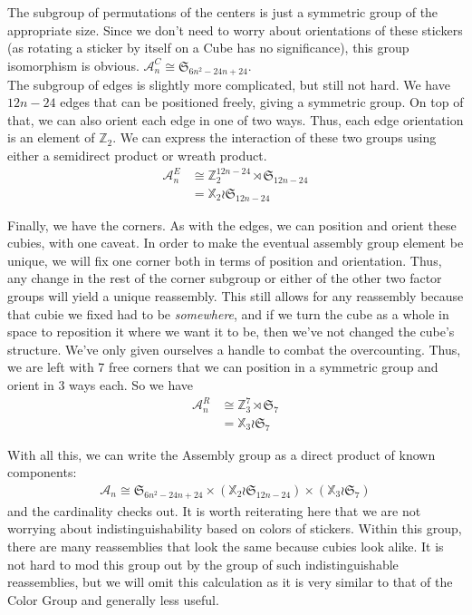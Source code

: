 \documentclass[10pt,letterpaper]{report}
\begin{document}
The subgroup of permutations of the centers is just a symmetric group of the appropriate size.  Since we don't need to worry about orientations of these stickers (as rotating a sticker by itself on a Cube has no significance), this group isomorphism is obvious. $ \mathcal{A}_n^C \cong \mathfrak{S}_{6n^2 - 24n + 24}$. \\

The subgroup of edges is slightly more complicated, but still not hard.  We have $12n-24$ edges that can be positioned freely, giving a symmetric group.  On top of that, we can also orient each edge in one of two ways.  Thus, each edge orientation is an element of $\mathbb{Z}_2$.  We can express the interaction of these two groups using either a semidirect product or wreath product.\begin{align*}
\mathcal{A}_n^E 
&\cong\mathbb{Z}_2^{12n-24} \rtimes \mathfrak{S}_{12n-24} \\
&= \mathbb{X}_2 \wr \mathfrak{S}_{12n-24}
\end{align*}

Finally, we have the corners.  As with the edges, we can position and orient these cubies, with one caveat.  In order to make the eventual assembly group element be unique, we will fix one corner both in terms of position and orientation.  Thus, any change in the rest of the corner subgroup or either of the other two factor groups will yield a unique reassembly.  This still allows for any reassembly because that cubie we fixed had to be \textit{somewhere}, and if we turn the cube as a whole in space to reposition it where we want it to be, then we've not changed the cube's structure.  We've only given ourselves a handle to combat the overcounting.  Thus, we are left with 7 free corners that we can position in a symmetric group and orient in 3 ways each.  So we have \begin{align*}
\mathcal{A}_n^R
&\cong\mathbb{Z}_3^7 \rtimes \mathfrak{S}_7 \\
&= \mathbb{X}_3 \wr \mathfrak{S}_7
\end{align*}

With all this, we can write the Assembly group as a direct product of known components:
\begin{align*}
\mathcal{A}_n \cong
\mathfrak{S}_{6n^2 - 24n + 24} \times
(\mathbb{X}_2 \wr \mathfrak{S}_{12n-24}) \times
(\mathbb{X}_3 \wr \mathfrak{S}_7)
\end{align*}
and the cardinality checks out.  It is worth reiterating here that we are not worrying about indistinguishability based on colors of stickers.  Within this group, there are many reassemblies that look the same because cubies look alike.  It is not hard to mod this group out by the group of such indistinguishable reassemblies, but we will omit this calculation as it is very similar to that of the Color Group and generally less useful. \\
\end{document}
